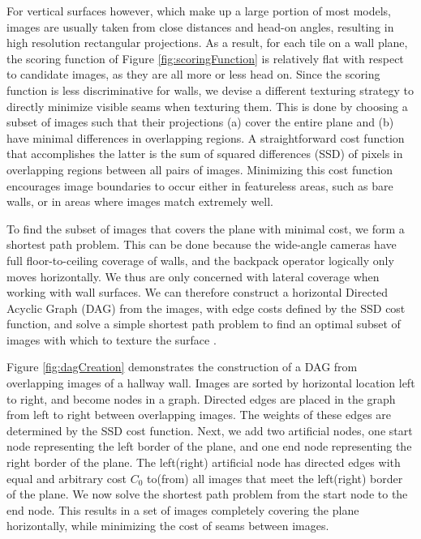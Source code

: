 \documentclass[]{spie}  %
\begin{document}
For vertical surfaces however, which make up a large portion of most
models, images are usually taken from close distances and head-on
angles, resulting in high resolution rectangular projections. As a
result, for each tile on a wall plane, the scoring function of Figure
\ref{fig:scoringFunction} is relatively flat with respect to candidate
images, as they are all more or less head on. Since the scoring
function is less discriminative for walls, we devise a different
texturing strategy to directly minimize visible seams when texturing
them. This is done by choosing a subset of images such that their
projections (a) cover the entire plane and (b) have minimal
differences in overlapping regions. A straightforward cost function
that accomplishes the latter is the sum of squared differences (SSD)
of pixels in overlapping regions between all pairs of
images. Minimizing this cost function encourages image boundaries to
occur either in featureless areas, such as bare walls, or in areas
where images match extremely well.

To find the subset of images that covers the plane with minimal cost,
we form a shortest path problem. This can be done because the
wide-angle cameras have full floor-to-ceiling coverage of walls, and
the backpack operator logically only moves horizontally. We thus are
only concerned with lateral coverage when working with wall
surfaces. We can therefore construct a horizontal Directed Acyclic
Graph (DAG) from the images, with edge costs defined by the SSD cost
function, and solve a simple shortest path problem to find an optimal
subset of images with which to texture the surface \cite{dijkstra}.


Figure \ref{fig:dagCreation} demonstrates the construction of a DAG
from overlapping images of a hallway wall. Images are sorted by
horizontal location left to right, and become nodes in a
graph. Directed edges are placed in the graph from left to right
between overlapping images. The weights of these edges are determined
by the SSD cost function. Next, we add two artificial nodes, one start
node representing the left border of the plane, and one end node
representing the right border of the plane. The left(right) artificial
node has directed edges with equal and arbitrary cost $C_0$ to(from)
all images that meet the left(right) border of the plane. We now solve
the shortest path problem from the start node to the end node. This
results in a set of images completely covering the plane horizontally,
while minimizing the cost of seams between images.
\end{document}
